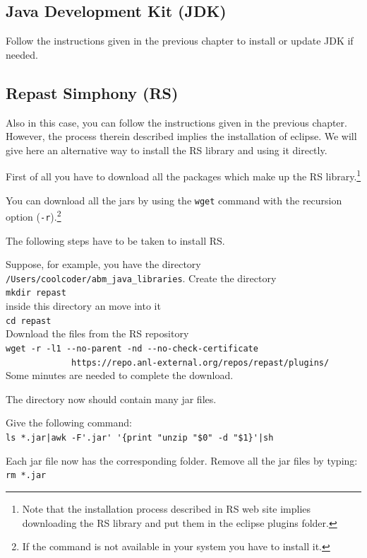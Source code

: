 \documentclass{book}
\begin{document}
\subsection{Java Development Kit (JDK)}
Follow the instructions given in the previous chapter to install or update JDK if needed. 
\subsection{Repast Simphony (RS)}
Also in this case, you can follow the instructions given in the previous chapter. However, the process therein described implies the installation of eclipse. We will give here an alternative way to install the RS library and using it directly.

First of all you have to download all the packages which make up the RS library.\footnote{Note that the installation process described in RS web site implies downloading the RS library and put them in the eclipse plugins folder.}

You can download all the jars by using the \verb+wget+ command with the recursion option (\verb+-r+).\footnote{If the command is not available in your system you have to install it.}

The following steps have to be taken to install RS.

Suppose, for example, you have the directory \verb+/Users/coolcoder/abm_java_libraries+. Create the directory\\
\verb+mkdir repast+\\
inside this directory an move into it\\
\verb+cd repast+\\

Download the files from the RS repository\\
\verb+wget -r -l1 --no-parent -nd --no-check-certificate +\\
\verb+             https://repo.anl-external.org/repos/repast/plugins/+\\

Some minutes are needed to complete the download.%

The directory now should contain many jar files.

Give the following command:\\
\verb+ls *.jar|awk -F'.jar' '{print "unzip "$0" -d "$1}'|sh+

Each jar file now has the corresponding folder.
Remove all the jar files by typing:\\
\verb+rm *.jar+
\end{document}
